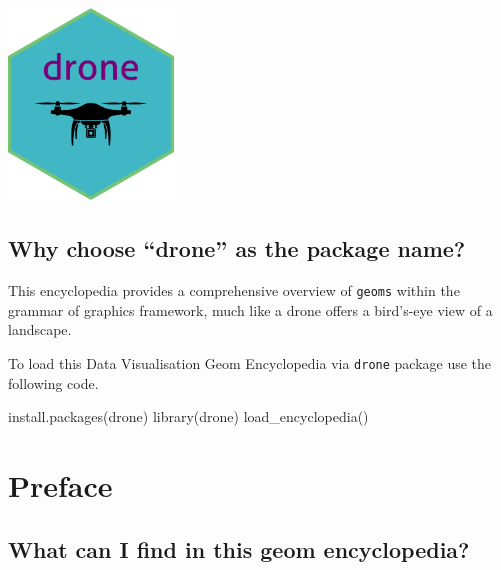 \documentclass[
  letterpaper,
  DIV=11,
  numbers=noendperiod]{scrreprt}
\newenvironment{Shaded}{\begin{snugshade}}{\end{snugshade}}
\newcommand{\FunctionTok}[1]{\textcolor[rgb]{0.28,0.35,0.67}{#1}}
\newcommand{\NormalTok}[1]{\textcolor[rgb]{0.00,0.23,0.31}{#1}}
\begin{document}

\begin{center}
\includegraphics[width=1.73in,height=\textheight]{dronehex.png}
\end{center}

\section*{Why choose ``drone'' as the package
name?}\label{why-choose-drone-as-the-package-name}


This encyclopedia provides a comprehensive overview of \texttt{geoms}
within the grammar of graphics framework, much like a drone offers a
bird's-eye view of a landscape.

To load this {Data Visualisation Geom Encyclopedia} via \texttt{drone}
package use the following code.

\begin{Shaded}
\begin{Highlighting}[]
\FunctionTok{install.packages}\NormalTok{(drone)}
\FunctionTok{library}\NormalTok{(drone)}
\FunctionTok{load\_encyclopedia}\NormalTok{()}
\end{Highlighting}
\end{Shaded}


\chapter*{Preface}\label{preface}


\section*{\texorpdfstring{What can I find in this {geom
encyclopedia}?}{What can I find in this geom encyclopedia?}}\label{what-can-i-find-in-this-geom-encyclopedia}
\end{document}
